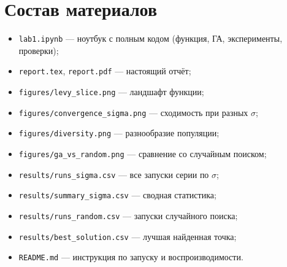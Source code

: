 \documentclass[12pt,a4paper]{article}
\begin{document}
\section*{Состав материалов}

\begin{itemize}
\item \texttt{lab1.ipynb} --- ноутбук с полным кодом (функция, ГА,
  эксперименты, проверки);
\item \texttt{report.tex}, \texttt{report.pdf} --- настоящий отчёт;
\item \texttt{figures/levy\_slice.png} --- ландшафт функции;
\item \texttt{figures/convergence\_sigma.png} --- сходимость при разных $\sigma$;
\item \texttt{figures/diversity.png} --- разнообразие популяции;
\item \texttt{figures/ga\_vs\_random.png} --- сравнение со случайным поиском;
\item \texttt{results/runs\_sigma.csv} --- все запуски серии по $\sigma$;
\item \texttt{results/summary\_sigma.csv} --- сводная статистика;
\item \texttt{results/runs\_random.csv} --- запуски случайного поиска;
\item \texttt{results/best\_solution.csv} --- лучшая найденная точка;
\item \texttt{README.md} --- инструкция по запуску и воспроизводимости.
\end{itemize}
\end{document}
